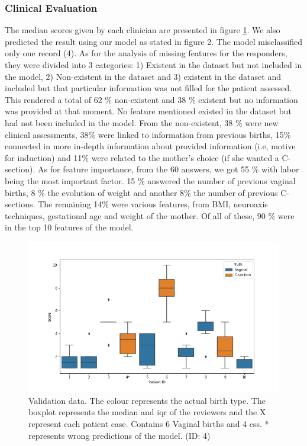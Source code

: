\subsubsection{Clinical Evaluation}
The median scores given by each clinician are presented in figure \ref{fig:clinical}. We also predicted the result using our model as stated in figure 2. The model misclassified only one record (4). As for the analysis of missing features for the responders, they were divided into 3 categories: 1) Existent in the dataset but not included in the model, 2) Non-existent in the dataset and 3) existent in the dataset and included but that particular information was not filled for the patient assessed. This rendered a total of 62 \% non-existent and 38 \% existent but no information was provided at that moment. No feature mentioned existed in the dataset but had not been included in the model. From the non-existent, 38 \% were new clinical assessments, 38\% were linked to information from previous births, 15\% connected in more in-depth information about provided information (i.e, motive for induction) and 11\% were related to the mother's choice (if she wanted a C-section). As for feature importance, from the 60 answers, we got 55 \% with labor being the most important factor. 15 \% answered the number of previous vaginal births, 8 \% the evolution of weight and another 8\% the number of previous C-sections. The remaining 14\% were various features, from BMI, neuroaxis techniques, gestational age and weight of the mother. Of all of these, 90 \% were in the top 10 features of the model.




\begin{figure}[htbp]
\centering
\captionsetup{justification=centering}
\caption[Obstetrics questionnaires data]{Validation data. The colour represents the actual birth type. The boxplot represents the median and \ac{iqr} of the reviewers and the X represent each patient case. Contains 6 Vaginal births and 4 \acp{cs}. * represents wrong predictions of the model. (ID: 4)}\label{fig:clinical} 
\includegraphics[scale=0.60]{figures/clinical_assessment.png}
\end{figure}




